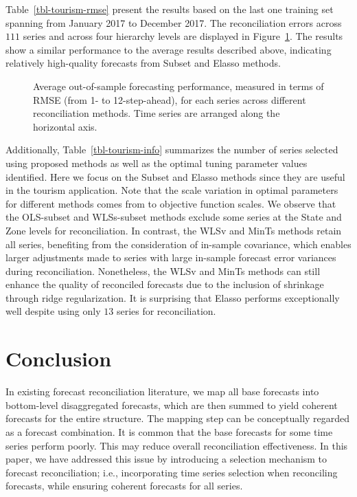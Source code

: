 \documentclass[
  11pt]{article}
\theoremstyle{plain}
\theoremstyle{remark}
\begin{document}
Table~\ref{tbl-tourism-rmse} present the results based on the last one
training set spanning from January 2017 to December 2017. The
reconciliation errors across \(111\) series and across four hierarchy
levels are displayed in Figure~\ref{fig-tourism-rmse}. The results show
a similar performance to the average results described above, indicating
relatively high-quality forecasts from Subset and Elasso methods.

\begin{figure}[!t]


\caption{\label{fig-tourism-rmse}Average out-of-sample forecasting
performance, measured in terms of RMSE (from 1- to 12-step-ahead), for
each series across different reconciliation methods. Time series are
arranged along the horizontal axis.}

\end{figure}%

Additionally, Table~\ref{tbl-tourism-info} summarizes the number of
series selected using proposed methods as well as the optimal tuning
parameter values identified. Here we focus on the Subset and Elasso
methods since they are useful in the tourism application. Note that the
scale variation in optimal parameters for different methods comes from
to objective function scales. We observe that the OLS-subset and
WLSs-subset methods exclude some series at the State and Zone levels for
reconciliation. In contrast, the WLSv and MinTs methods retain all
series, benefiting from the consideration of in-sample covariance, which
enables larger adjustments made to series with large in-sample forecast
error variances during reconciliation. Nonetheless, the WLSv and MinTs
methods can still enhance the quality of reconciled forecasts due to the
inclusion of shrinkage through ridge regularization. It is surprising
that Elasso performs exceptionally well despite using only \(13\) series
for reconciliation.

\section{Conclusion}\label{sec-conclusion}

In existing forecast reconciliation literature, we map all base
forecasts into bottom-level disaggregated forecasts, which are then
summed to yield coherent forecasts for the entire structure. The mapping
step can be conceptually regarded as a forecast combination. It is
common that the base forecasts for some time series perform poorly. This
may reduce overall reconciliation effectiveness. In this paper, we have
addressed this issue by introducing a selection mechanism to forecast
reconciliation; i.e., incorporating time series selection when
reconciling forecasts, while ensuring coherent forecasts for all series.
\end{document}
